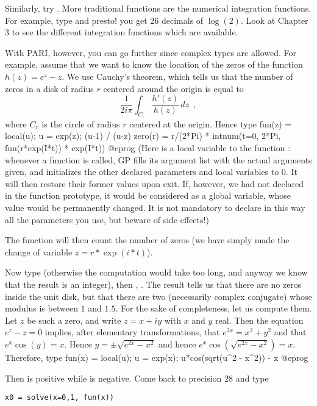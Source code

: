 Similarly, try .
\medskip
%
More traditional functions are the numerical integration functions.
For example, type  and presto! you get 26 decimals
of $\log(2)$. Look at Chapter 3 to see the different integration functions
which are available.

With PARI, however, you can go further since complex types are allowed.
For example, assume that we want to know the location of the zeros of the
function $h(z)=e^z-z$. We use Cauchy's theorem, which tells us that the
number of zeros in a disk of radius $r$ centered around the origin is
equal to
$$\dfrac{1}{2i\pi}\int_{C_r}\dfrac{h'(z)}{h(z)}\,dz\enspace,$$
where $C_r$ is the circle of radius $r$ centered at the origin.
Hence type
\bprog
fun(z) =
{
  local(u);
  u = exp(z);
  (u-1) / (u-z)
}
zero(r) = r/(2*Pi) * intnum(t=0, 2*Pi, fun(r*exp(I*t)) * exp(I*t))
@eprog
\noindent (Here  is a local variable to the function : whenever
a function is called, GP fills its argument list with the actual arguments
given, and initializes the other declared parameters and local variables to
0. It will then restore their former values upon exit. If, however, we had
not declared  in the function prototype, it would be considered as a
global variable, whose value would be permanently changed. It is not
mandatory to declare in this way all the parameters you use, but beware of
side effects!)

The function  will then count the number of zeros (we have simply
made the change of variable $z = r*\exp(i*t)$).

Now type  (otherwise the computation would take too long, and
anyway we know that the result is an integer), then , .
The result tells us that there are no zeros inside the unit disk, but that
there are two (necessarily complex conjugate) whose modulus is between $1$
and $1.5$. For the sake of completeness, let us compute them. Let $z$ be such
a zero, and write $z=x+iy$ with $x$ and $y$ real. Then the equation $e^z-z=0$
implies, after elementary transformations, that $e^{2x}=x^2+y^2$ and that
$e^x\cos(y)=x$. Hence $y=\pm\sqrt{e^{2x}-x^2}$ and hence
$e^x\cos(\sqrt{e^{2x}-x^2})=x$. Therefore, type
\bprog
fun(x) =
{
  local(u);
  u = exp(x);
  u*cos(sqrt(u^2 - x^2)) - x
}
@eprog

Then  is positive while  is negative. Come back to
precision 28 and type

\centerline{\tt x0 = solve(x=0,1, fun(x))}

